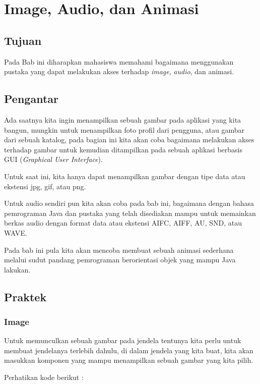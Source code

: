 \chapter{Image, Audio, dan Animasi}

\section{Tujuan}

Pada Bab ini diharapkan mahasiswa memahami bagaimana menggunakan pustaka yang dapat melakukan akses terhadap \textit{image}, \textit{audio}, dan animasi.

\section{Pengantar}

Ada saatnya kita ingin menampilkan sebuah gambar pada aplikasi yang kita bangun, mungkin untuk menampilkan foto profil dari pengguna, atau gambar dari sebuah katalog, pada bagian ini kita akan coba bagaimana melakukan akses terhadap gambar untuk kemudian ditampilkan pada sebuah aplikasi berbasis GUI (\textit{Graphical User Interface}). 

Untuk saat ini, kita hanya dapat menampilkan gambar dengan tipe data atau ekstensi jpg, gif, atau png.

Untuk audio sendiri pun kita akan coba pada bab ini, bagaimana dengan bahasa pemrograman Java dan pustaka yang telah disediakan mampu untuk memainkan berkas audio dengan format data atau ekstensi AIFC, AIFF, AU, SND, atau WAVE.

Pada bab ini pula kita akan mencoba membuat sebuah animasi sederhana melalui sudut pandang pemrograman berorientasi objek yang mampu Java lakukan.

\section{Praktek}

\subsection{Image}

Untuk memunculkan sebuah gambar pada jendela tentunya kita perlu untuk membuat jendelanya terlebih dahulu, di dalam jendela yang kita buat, kita akan masukkan komponen yang mampu menampilkan sebuah gambar yang kita pilih. 

Perhatikan kode berikut :

